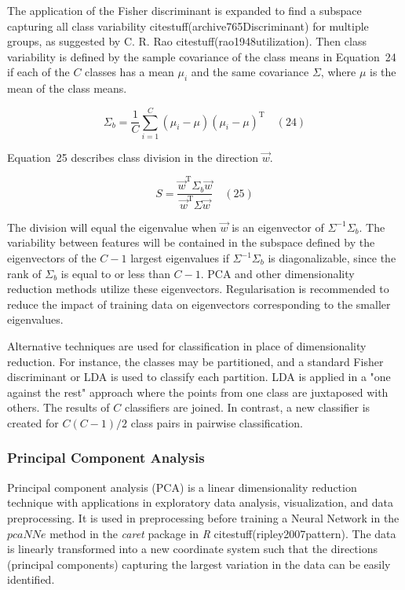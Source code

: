 \documentclass[preprint,12pt]{elsarticle}
\begin{document}
The application of the Fisher discriminant is expanded to find a subspace capturing all class variability citestuff(archive765Discriminant) for multiple groups, as suggested by C. R. Rao citestuff(rao1948utilization). Then class variability is defined by the sample covariance of the class means in Equation~24 if each of the $C$ classes has a mean $\mu_{i}$ and the same covariance $\Sigma$, where $\mu$ is the mean of the class means.

\begin{equation}
	\Sigma_{b}={\frac{1}{C}}\sum_{i=1}^{C}\left(\mu_{i}-\mu\right)\left(\mu_{i}-\mu\right)^{\mathrm{T}}
	\quad\left(24\right)
\end{equation}

Equation~25 describes class division in the direction $\vec{w}$.

\begin{equation}
	S={\frac{{\vec{w}}^{\mathrm{T}}\Sigma_{b}{\vec{w}}}{{\vec{w}}^{\mathrm{T}}\Sigma {\vec{w}}}}
	\quad\left(25\right)
\end{equation}

The division will equal the eigenvalue when $\vec{w}$ is an eigenvector of $\Sigma ^{-1}\Sigma_{b}$. The variability between features will be contained in the subspace defined by the eigenvectors of the $C - 1$ largest eigenvalues if $\Sigma ^{-1}\Sigma_{b}$ is diagonalizable, since the rank of $\Sigma_{b}$ is equal to or less than $C - 1$. PCA and other dimensionality reduction methods utilize these eigenvectors. Regularisation is recommended to reduce the impact of training data on eigenvectors corresponding to the smaller eigenvalues.

Alternative techniques are used for classification in place of dimensionality reduction. For instance, the classes may be partitioned, and a standard Fisher discriminant or LDA is used to classify each partition. LDA is applied in a "one against the rest" approach where the points from one class are juxtaposed with others. The results of $C$ classifiers are joined. In contrast, a new classifier is created for $ C(C - 1)/2$ class pairs in pairwise classification.

\subsubsection{Principal Component Analysis}

Principal component analysis (PCA) is a linear dimensionality reduction technique with applications in exploratory data analysis, visualization, and data preprocessing. It is used in preprocessing before training a Neural Network in the $pcaNNe$ method in the \textit{caret} package in \textit{R} citestuff(ripley2007pattern). The data is linearly transformed into a new coordinate system such that the directions (principal components) capturing the largest variation in the data can be easily identified.
\end{document}
